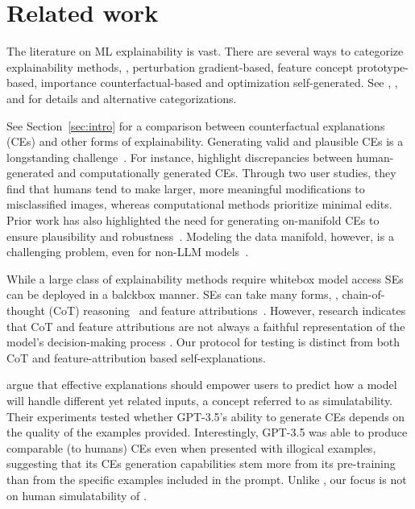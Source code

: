 \section{Related work}

The literature on ML explainability is vast. There are several ways to categorize explainability methods, \eg, perturbation \vs gradient-based, feature \vs concept \vs prototype-based, importance \vs counterfactual-based and optimization \vs self-generated.
See \citet{gilpin2018explaining}, \citet{10.1145/3236009}, and \citet{zhao2024explainability} for details and alternative categorizations. 



See Section~\ref{sec:intro} for a comparison between counterfactual explanations (CEs) and other forms of explainability.
Generating valid and plausible CEs is a longstanding challenge~\cite{verma2024counterfactual}.
For instance, \citet{delaney2023counterfactual} highlight discrepancies between human-generated and computationally generated CEs. Through two user studies, they find that humans tend to make larger, more meaningful modifications to misclassified images, whereas computational methods prioritize minimal edits.
Prior work has also highlighted the need for generating on-manifold CEs to ensure plausibility and robustness~\cite{tsiourvas2024manifold,slack2021counterfactual}. Modeling the data manifold, however, is a challenging problem, even for non-LLM models~\cite{arvanitidis2016locally}.





While a large class of explainability methods require whitebox model access SEs can be deployed in a balckbox manner.
SEs can take many forms, \eg, chain-of-thought (CoT) reasoning~\citep{agarwal2024faithfulness} and feature attributions~\cite{tanneru2024quantifying}.
However, research indicates that CoT and feature attributions are not always a faithful representation of the model's decision-making process \citep{turpin2024language,lanham2023measuring,tanneru2024quantifying}.
Our protocol for testing \SCEs is distinct from both CoT and feature-attribution based self-explanations.

\citet{chen2023models} argue that effective explanations should empower users to predict how a model will handle different yet related inputs, a concept referred to as simulatability. 
Their experiments tested whether GPT-3.5's ability to generate CEs depends on the quality of the examples provided. Interestingly, GPT-3.5 was able to produce comparable (to humans) CEs even when presented with illogical examples, suggesting that its CEs generation capabilities stem more from its pre-training than from the specific examples included in the prompt.
Unlike \citet{chen2023models}, our focus is not on human simulatability of \SCEs.


